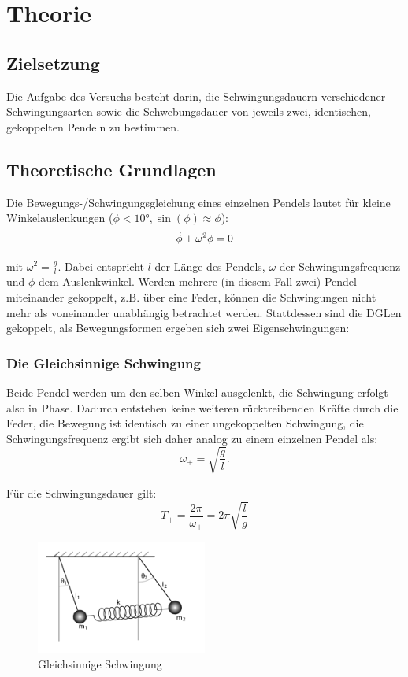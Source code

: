 \section{Theorie}
\label{sec:Theorie}

\subsection{Zielsetzung}
Die Aufgabe des Versuchs besteht darin, die Schwingungsdauern verschiedener
Schwingungsarten sowie die Schwebungsdauer von jeweils zwei, identischen,
gekoppelten Pendeln zu bestimmen.
\subsection{Theoretische Grundlagen}
Die Bewegungs-/Schwingungsgleichung eines einzelnen Pendels lautet für kleine
Winkelauslenkungen ($\phi < \ang{10}, \sin(\phi) \approx \phi$):
\begin{equation}
  \centering
  \dot{\phi}+ \omega^2 \phi = 0
  \label{eqn:schwgl}
\end{equation}

mit $\omega ^2 = \frac{g}{l}.$
Dabei entspricht $l$ der Länge des Pendels, $\omega$ der Schwingungsfrequenz und
$\phi$ dem Auslenkwinkel.
Werden mehrere (in diesem Fall zwei) Pendel miteinander gekoppelt, z.B. über
eine Feder, können die Schwingungen nicht mehr als voneinander unabhängig
betrachtet werden. Stattdessen sind die DGLen gekoppelt, als
Bewegungsformen ergeben sich zwei Eigenschwingungen:

\subsubsection{Die Gleichsinnige Schwingung}

Beide Pendel werden um den selben Winkel \phi ausgelenkt, die Schwingung erfolgt
also in Phase. Dadurch entstehen keine weiteren rücktreibenden Kräfte durch
die Feder, die Bewegung ist identisch zu einer ungekoppelten Schwingung, die
Schwingungsfrequenz ergibt sich daher analog zu einem einzelnen Pendel als:
\begin{equation}
  \omega_+ = \sqrt{\frac{g}{l}}.
  \label{eqn:omega+}
\end{equation}

Für die Schwingungsdauer gilt:
\begin{equation}
T_+ = \frac{2\pi}{\omega_+} = 2\pi \sqrt{\frac{l}{g}}
\label{eqn:T+}
\end{equation}
\begin{figure}[H]
  \centering
  \includegraphics[width=0.5\textwidth]{graphics/gleichsinnig.png}
  \caption{Gleichsinnige Schwingung \cite{Wikipedia}}
\end{figure}

